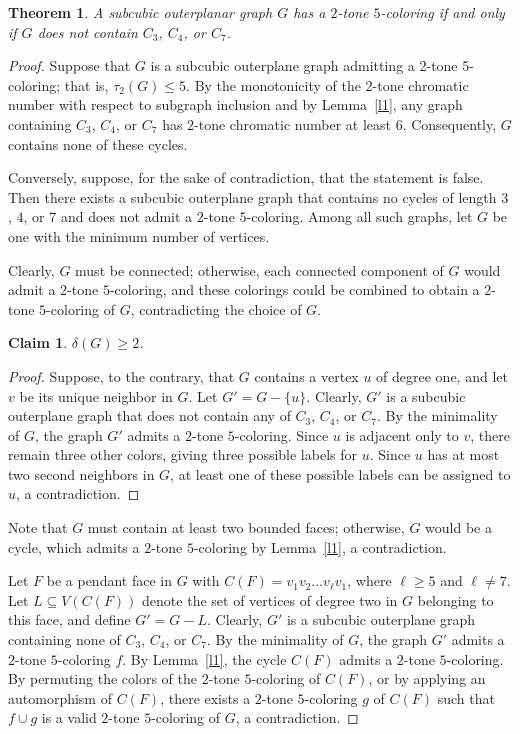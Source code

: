 \documentclass[12pt]{article}
\newtheorem{theorem}{Theorem}
\numberwithin{theorem}{section}
\numberwithin{conjecture}{section}
\numberwithin{corollary}{section}
\numberwithin{example}{section}
\numberwithin{lemma}{section}
\numberwithin{proposition}{section}
\numberwithin{problem}{section}
\numberwithin{remark}{section}
\newtheorem{claim}{Claim}
\numberwithin{claim}{theorem}
\numberwithin{definition}{section}
\begin{document}
\begin{theorem}\label{t1}
   A subcubic outerplanar graph $G$ has a $2$-tone $5$-coloring if and only if $G$ does not contain $C_3$, $C_4$, or $C_7$.
\end{theorem}

\begin{proof} 
Suppose that $G$ is a subcubic outerplane graph admitting a 2-tone 5-coloring; that is, $\tau_2(G)\le 5$. By the monotonicity of the $2$-tone chromatic number with respect to subgraph inclusion and by Lemma~\ref{l1}, any graph containing $C_3$, $C_4$, or $C_7$ has $2$-tone chromatic number at least $6$. Consequently, $G$ contains none of these cycles.

\noindent Conversely, suppose, for the sake of contradiction, that the statement is false. Then there exists a subcubic outerplane graph that contains no cycles of length $3$, $4$, or $7$ and does not admit a $2$-tone $5$-coloring. Among all such graphs, let $G$ be one with the minimum number of vertices. 

\noindent Clearly, $G$ must be connected; otherwise, each connected component of $G$ would admit a $2$-tone $5$-coloring, and these colorings could be combined to obtain a $2$-tone $5$-coloring of $G$, contradicting the choice of $G$.

\begin{claim}
    $\delta(G)\geq 2$.
\end{claim} 

\begin{proof}
Suppose, to the contrary, that $G$ contains a vertex $u$ of degree one, and let $v$ be its unique neighbor in $G$. Let $G' = G - \{u\}$. Clearly, $G'$ is a subcubic outerplane graph that does not contain any of $C_3$, $C_4$, or $C_7$. By the minimality of $G$, the graph $G'$ admits a $2$-tone $5$-coloring. Since $u$ is adjacent only to $v$, there remain three other colors, giving three possible labels for $u$. Since $u$ has at most two second neighbors in $G$, at least one of these possible labels can be assigned to $u$, a contradiction.\end{proof}

\noindent Note that $G$ must contain at least two bounded faces; otherwise, $G$ would be a cycle, which admits a $2$-tone $5$-coloring by Lemma~\ref{l1}, a contradiction.

\noindent Let $F$ be a pendant face in $G$ with $C(F)=v_1v_2\ldots v_\ell v_1$, where $\ell\ge 5$ and $\ell\neq 7$. Let $L\subseteq V(C(F))$ denote the set of vertices of degree two in $G$ belonging to this face, and define $G' = G-L$. Clearly, $G'$ is a subcubic outerplane graph containing none of $C_3$, $C_4$, or $C_7$. By the minimality of $G$, the graph $G'$ admits a $2$-tone $5$-coloring $f$. By Lemma~\ref{l1}, the cycle $C(F)$ admits a $2$-tone $5$-coloring. By permuting the colors of the $2$-tone $5$-coloring of $C(F)$, or by applying an automorphism of $C(F)$, there exists a $2$-tone $5$-coloring $g$ of $C(F)$ such that $f\cup g$ is a valid $2$-tone $5$-coloring of $G$, a contradiction.\end{proof}
\end{document}
